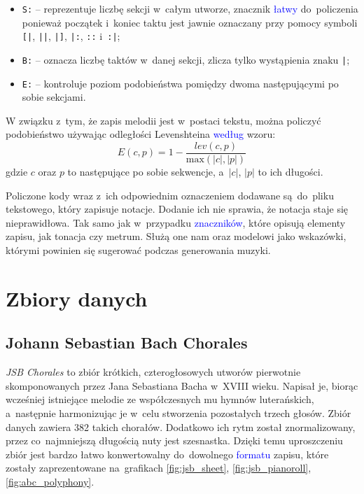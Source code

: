 \documentclass[data-science]{agh-wi} %
\begin{document}
\begin{itemize}
    \item \texttt{S:} -- reprezentuje liczbę sekcji w~całym utworze, znacznik \textcolor{blue}{łatwy} do~policzenia ponieważ początek i~koniec taktu jest jawnie oznaczany przy pomocy symboli \texttt{[|}, \texttt{||}, \texttt{|]}, \texttt{|:}, \texttt{::} i~\texttt{:|};
    \item \texttt{B:} -- oznacza liczbę taktów w~danej sekcji, zlicza tylko wystąpienia znaku \texttt{|};
    \item \texttt{E:} -- kontroluje poziom podobieństwa pomiędzy dwoma następującymi po sobie sekcjami.
\end{itemize}

W związku z~tym, że zapis melodii jest w~postaci tekstu, można policzyć podobieństwo używając odległości Levenshteina \textcolor{blue}{według} wzoru:
\begin{equation}
    E(c,p) = 1 - \dfrac{lev(c, p)}{\text{max}(|c|, |p|)}
\end{equation} %
gdzie $c$ oraz $p$ to następujące po sobie sekwencje, a~$|c|$, $|p|$ to ich długości.

Policzone kody wraz z~ich odpowiednim oznaczeniem dodawane są~do~pliku tekstowego, który zapisuje notacje. Dodanie ich nie sprawia, że notacja staje się nieprawidłowa. Tak samo jak w~przypadku \textcolor{blue}{znaczników}, które opisują elementy zapisu, jak tonacja czy metrum. Służą one nam oraz modelowi jako wskazówki, którymi powinien się sugerować podczas generowania muzyki.

\section{Zbiory danych}

\subsection{Johann Sebastian Bach Chorales}
\textit{JSB Chorales} \cite{bachchorales} to zbiór krótkich, czterogłosowych utworów pierwotnie skomponowanych przez Jana Sebastiana Bacha w~XVIII wieku. Napisał je, biorąc wcześniej istniejące melodie ze współczesnych mu hymnów luterańskich, a~następnie harmonizując je w~celu stworzenia pozostałych trzech głosów. Zbiór danych zawiera 382 takich chorałów. Dodatkowo ich rytm został znormalizowany, przez co~najmniejszą długością nuty jest szesnastka. Dzięki temu uproszczeniu zbiór jest bardzo łatwo konwertowalny do~dowolnego \textcolor{blue}{formatu} zapisu, które zostały zaprezentowane na~grafikach \ref*{fig:jsb_sheet}, \ref*{fig:jsb_pianoroll}, \ref*{fig:abc_polyphony}.
\end{document}
